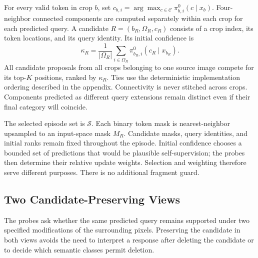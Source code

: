 \documentclass[letterpaper]{article}
\begin{document}
For every valid token in crop $b$, set $\widehat c_{b,i}=\arg\max_{c\in\mathcal C}\pi^0_{b,i}(c\mid x_b)$. Four-neighbor connected components are computed separately within each crop for each predicted query. A candidate $R=(b_R,\Omega_R,c_R)$ consists of a crop index, its token locations, and its query identity. Its initial confidence is
\begin{equation}
\kappa_R=\frac{1}{|\Omega_R|}\sum_{i\in\Omega_R}
\pi^0_{b_R,i}(c_R\mid x_{b_R}).
\end{equation}
All candidate proposals from all crops belonging to one source image compete for its top-$K$ positions, ranked by $\kappa_R$. Ties use the deterministic implementation ordering described in the appendix. Connectivity is never stitched across crops. Components predicted as different query extensions remain distinct even if their final category will coincide.

The selected episode set is $\mathcal S$. Each binary token mask is nearest-neighbor upsampled to an input-space mask $M_R$. Candidate masks, query identities, and initial ranks remain fixed throughout the episode. Initial confidence chooses a bounded set of predictions that would be plausible self-supervision; the probes then determine their relative update weights. Selection and weighting therefore serve different purposes. There is no additional fragment guard.

\subsection{Two Candidate-Preserving Views}
The probes ask whether the same predicted query remains supported under two specified modifications of the surrounding pixels. Preserving the candidate in both views avoids the need to interpret a response after deleting the candidate or to decide which semantic classes permit deletion.
\end{document}
